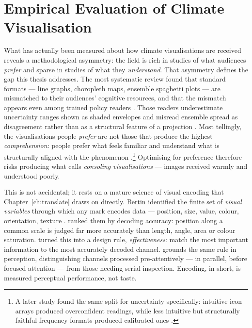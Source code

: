 \section{Empirical Evaluation of Climate Visualisation}
\label{sec:empirical-viz}

What has actually been measured about how climate visualisations are received reveals a methodological asymmetry: the field is rich in studies of what audiences \emph{prefer} and sparse in studies of what they \emph{understand}. That asymmetry defines the gap this thesis addresses. The most systematic review found that standard formats --- line graphs, choropleth maps, ensemble spaghetti plots --- are mismatched to their audiences' cognitive resources, and that the mismatch appears even among trained policy readers \citep{harold2016}. Those readers underestimate uncertainty ranges shown as shaded envelopes and misread ensemble spread as disagreement rather than as a structural feature of a projection \citep{mcmahon2015}. Most tellingly, the visualisations people \emph{prefer} are not those that produce the highest \emph{comprehension}: people prefer what feels familiar and understand what is structurally aligned with the phenomenon \citep{kause2020}.\footnote{A later study found the same split for uncertainty specifically: intuitive icon arrays produced overconfident readings, while less intuitive but structurally faithful frequency formats produced calibrated ones \citep{kause2021}.} Optimising for preference therefore risks producing what \citet{sheppard2015} calls \emph{consoling visualisations} --- images received warmly and understood poorly.
 
This is not accidental; it rests on a mature science of visual encoding that Chapter~\ref{ch:translate} draws on directly. Bertin identified the finite set of \emph{visual variables} through which any mark encodes data --- position, size, value, colour, orientation, texture \citep{bertin1983}. \citet{clevelandmcgill1984} ranked them by decoding accuracy: position along a common scale is judged far more accurately than length, angle, area or colour saturation. \citet{munzner2014} turned this into a design rule, \emph{effectiveness}: match the most important information to the most accurately decoded channel. \citet{ware2021} grounds the same rule in perception, distinguishing channels processed pre-attentively --- in parallel, before focused attention --- from those needing serial inspection. Encoding, in short, is measured perceptual performance, not taste.

